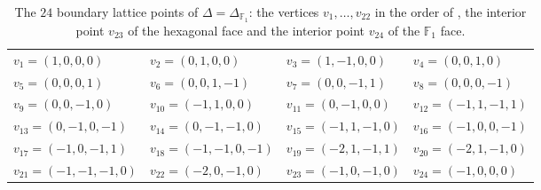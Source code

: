 \documentclass[11pt]{amsart}
\theoremstyle{definition}
\theoremstyle{remark}
\theoremstyle{plain}
\begin{document}
\begin{table}\centering
\caption{The $24$ boundary lattice points of $\Delta=\Delta_{\mathbb
F_1}$: the vertices $v_1,\dots,v_{22}$ in the order of
\cite[Theorem~6.1]{PaperIII}, the interior point $v_{23}$ of the
hexagonal face and the interior point $v_{24}$ of the $\mathbb F_1$
face.}\label{tab:partnerrays}
\begin{tabular}{llll}
\toprule
$v_1=(1,0,0,0)$ & $v_2=(0,1,0,0)$ & $v_3=(1,-1,0,0)$ &
$v_4=(0,0,1,0)$\\
$v_5=(0,0,0,1)$ & $v_6=(0,0,1,-1)$ & $v_7=(0,0,-1,1)$ &
$v_8=(0,0,0,-1)$\\
$v_9=(0,0,-1,0)$ & $v_{10}=(-1,1,0,0)$ & $v_{11}=(0,-1,0,0)$ &
$v_{12}=(-1,1,-1,1)$\\
$v_{13}=(0,-1,0,-1)$ & $v_{14}=(0,-1,-1,0)$ & $v_{15}=(-1,1,-1,0)$ &
$v_{16}=(-1,0,0,-1)$\\
$v_{17}=(-1,0,-1,1)$ & $v_{18}=(-1,-1,0,-1)$ & $v_{19}=(-2,1,-1,1)$ &
$v_{20}=(-2,1,-1,0)$\\
$v_{21}=(-1,-1,-1,0)$ & $v_{22}=(-2,0,-1,0)$ & $v_{23}=(-1,0,-1,0)$ &
$v_{24}=(-1,0,0,0)$\\
\bottomrule
\end{tabular}
\end{table}
\end{document}
